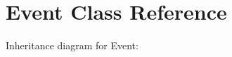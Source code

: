 \hypertarget{classEvent}{}\section{Event Class Reference}
\label{classEvent}


Inheritance diagram for Event\+:
